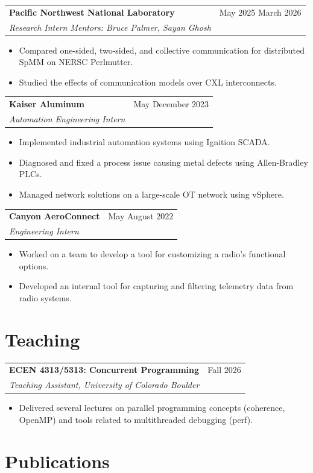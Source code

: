 \documentclass[letterpaper,10pt]{article}
\newcommand{\entry}[4]{%
  \begin{tabularx}{\textwidth}{X r}
    \textbf{#1} & #2 \\
    \textit{#3} & \textit{#4} \\
  \end{tabularx}\par\vspace{1pt}%
}
\begin{document}
\entry{Pacific Northwest National Laboratory}{May 2025 \textendash{} March 2026}
      {Research Intern \textendash{} Mentors: Bruce Palmer, Sayan Ghosh}{}
\begin{itemize}
  \item Compared one-sided, two-sided, and collective communication for
        distributed SpMM on NERSC Perlmutter.
  \item Studied the effects of communication models over CXL interconnects.
\end{itemize}

\entry{Kaiser Aluminum}{May \textendash{} December 2023}
      {Automation Engineering Intern}{}
\begin{itemize}
  \item Implemented industrial automation systems using Ignition SCADA.
  \item Diagnosed and fixed a process issue causing metal defects using
        Allen-Bradley PLCs.
  \item Managed network solutions on a large-scale OT network using vSphere.
\end{itemize}

\entry{Canyon AeroConnect}{May \textendash{} August 2022}
      {Engineering Intern}{}
\begin{itemize}
  \item Worked on a team to develop a tool for customizing a radio's
        functional options.
  \item Developed an internal tool for capturing and filtering telemetry data
        from radio systems.
\end{itemize}

\section{Teaching}

\entry{ECEN 4313/5313: Concurrent Programming}{Fall 2026}
      {Teaching Assistant, University of Colorado Boulder}{}
\begin{itemize}
  \item Delivered several lectures on parallel programming concepts (coherence, OpenMP) and tools related to multithreaded debugging (perf).
\end{itemize}

\section{Publications}
\end{document}

